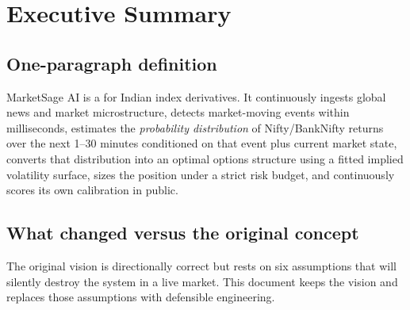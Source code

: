 \tableofcontents
\clearpage

\chapter{Executive Summary}

\section{One-paragraph definition}

MarketSage AI is a 
for Indian index derivatives. It continuously ingests global news and market
microstructure, detects market-moving events within milliseconds, estimates the
\emph{probability distribution} of Nifty/BankNifty returns over the next 1--30
minutes conditioned on that event plus current market state, converts that
distribution into an optimal options structure using a fitted implied
volatility surface, sizes the position under a strict risk budget, and
continuously scores its own calibration in public.

\section{What changed versus the original concept}

The original vision is directionally correct but rests on six assumptions that
will silently destroy the system in a live market. This document keeps the
vision and replaces those assumptions with defensible engineering.

